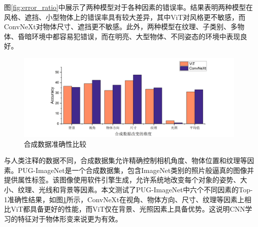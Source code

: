 图\ref{fig:error_ratio}中展示了两种模型对于各种因素的错误率。结果表明两种模型在风格、遮挡、小型物体上的错误率具有较大差异，其中ViT对风格更不敏感，而ConvNeXt对物体尺寸、遮挡更不敏感。此外，两种模型在纹理、子类别、多物体、昏暗环境中都容易犯错误，而在明亮、大型物体、不同姿态的环境中表现良好。

\begin{figure}[H]
    \centering
    \includegraphics[width=\textwidth]{pics/合成数据.png}
    \caption{合成数据准确性比较}
    \label{fig:synthetic data}
\end{figure}

与人类注释的数据不同，合成数据集允许精确控制相机角度、物体位置和纹理等因素。PUG-ImageNet是一个合成数据集，包含ImageNet类别的照片般逼真的图像并提供属性标签。该图像使用软件引擎生成，允许系统地改变每个对象的姿势、大小、纹理、光线和背景等因素。本文测试了PUG-ImageNet中六个不同因素的Top-1准确性结果，如图\ref{fig:synthetic data}所示，ConvNeXt在视角、物体方向、尺寸、纹理等因素上相比ViT都具备更好的性能，而ViT仅在背景、光照因素上具备优势。这说明CNN学习的特征对于物体形变来说更为有效。

